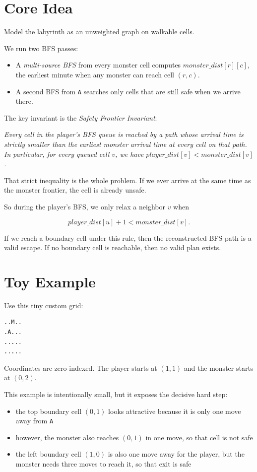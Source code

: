 \section{Core Idea}

Model the labyrinth as an unweighted graph on walkable cells.

We run two BFS passes:

\begin{itemize}
\item A \textit{multi-source BFS} from every monster cell computes
$monster\_dist[r][c]$, the earliest minute when any monster can reach cell
$(r,c)$.
\item A second BFS from \texttt{A} searches only cells that are still safe when
we arrive there.
\end{itemize}

The key invariant is the \textit{Safety Frontier Invariant}:

\textit{Every cell in the player's BFS queue is reached by a path whose arrival
time is strictly smaller than the earliest monster arrival time at every cell on
that path. In particular, for every queued cell $v$, we have
$player\_dist[v] < monster\_dist[v]$.}

That strict inequality is the whole problem. If we ever arrive at the same time
as the monster frontier, the cell is already unsafe.

So during the player's BFS, we only relax a neighbor $v$ when

$$
player\_dist[u] + 1 < monster\_dist[v].
$$

If we reach a boundary cell under this rule, then the reconstructed BFS path is
a valid escape. If no boundary cell is reachable, then no valid plan exists.

\section{Toy Example}

Use this tiny custom grid:

\begin{lstlisting}
..M..
.A...
.....
.....
\end{lstlisting}

Coordinates are zero-indexed. The player starts at $(1,1)$ and the monster
starts at $(0,2)$.

This example is intentionally small, but it exposes the decisive hard step:

\begin{itemize}
\item the top boundary cell $(0,1)$ looks attractive because it is only one move
away from \texttt{A}
\item however, the monster also reaches $(0,1)$ in one move, so that cell is
not safe
\item the left boundary cell $(1,0)$ is also one move away for the player, but
the monster needs three moves to reach it, so that exit is safe
\end{itemize}

